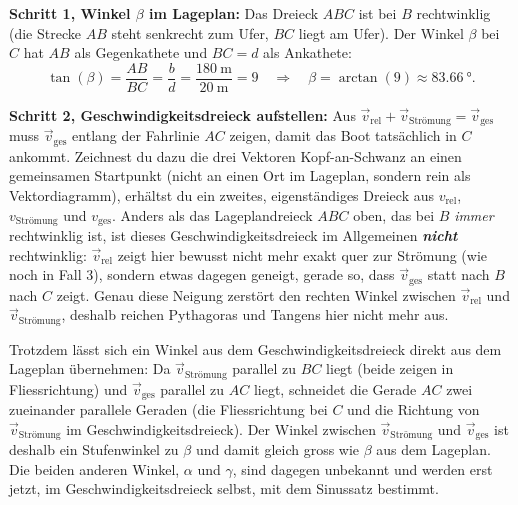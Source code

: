 \documentclass[addpoints,11pt,a4paper]{exam}
\begin{document}
\begin{vertiefungbox}
\textbf{Schritt 1, Winkel $\beta$ im Lageplan:} Das Dreieck $ABC$ ist bei
$B$ rechtwinklig (die Strecke $AB$ steht senkrecht zum Ufer, $BC$ liegt am
Ufer). Der Winkel $\beta$ bei $C$ hat $AB$ als Gegenkathete und $BC=d$ als
Ankathete:
\[
  \tan(\beta) = \frac{AB}{BC} = \frac{b}{d} = \frac{\SI{180}{\meter}}{\SI{20}{\meter}} = 9 \quad\Longrightarrow\quad \beta = \arctan(9) \approx \SI{83.66}{\degree}.
\]

\textbf{Schritt 2, Geschwindigkeitsdreieck aufstellen:} Aus
$\vec{v}_{\text{rel}}+\vec{v}_{\text{Strömung}}=\vec{v}_{\text{ges}}$ muss
$\vec{v}_{\text{ges}}$ entlang der Fahrlinie $AC$ zeigen, damit das Boot
tatsächlich in $C$ ankommt. Zeichnest du dazu die drei Vektoren
Kopf-an-Schwanz an einen gemeinsamen Startpunkt (nicht an einen Ort im
Lageplan, sondern rein als Vektordiagramm), erhältst du ein zweites,
eigenständiges Dreieck aus $v_{\text{rel}}$, $v_{\text{Strömung}}$ und
$v_{\text{ges}}$. Anders als das Lageplandreieck $ABC$ oben, das bei $B$
\emph{immer} rechtwinklig ist, ist dieses Geschwindigkeitsdreieck im
Allgemeinen \textbf{\emph{nicht}} rechtwinklig: $\vec{v}_{\text{rel}}$
zeigt hier bewusst nicht mehr exakt quer zur Strömung (wie noch in Fall 3),
sondern etwas dagegen geneigt, gerade so, dass $\vec{v}_{\text{ges}}$ statt
nach $B$ nach $C$ zeigt. Genau diese Neigung zerstört den rechten Winkel
zwischen $\vec{v}_{\text{rel}}$ und $\vec{v}_{\text{Strömung}}$, deshalb
reichen Pythagoras und Tangens hier nicht mehr aus.

Trotzdem lässt sich ein Winkel aus dem Geschwindigkeitsdreieck direkt aus
dem Lageplan übernehmen: Da $\vec{v}_{\text{Strömung}}$ parallel zu $BC$
liegt (beide zeigen in Fliessrichtung) und $\vec{v}_{\text{ges}}$ parallel
zu $AC$ liegt, schneidet die Gerade $AC$ zwei zueinander parallele Geraden
(die Fliessrichtung bei $C$ und die Richtung von $\vec{v}_{\text{Strömung}}$
im Geschwindigkeitsdreieck). Der Winkel zwischen $\vec{v}_{\text{Strömung}}$
und $\vec{v}_{\text{ges}}$ ist deshalb ein Stufenwinkel zu $\beta$ und damit
gleich gross wie $\beta$ aus dem Lageplan. Die beiden anderen Winkel,
$\alpha$ und $\gamma$, sind dagegen unbekannt und werden erst jetzt, im
Geschwindigkeitsdreieck selbst, mit dem Sinussatz bestimmt.


\end{vertiefungbox}
\end{document}
